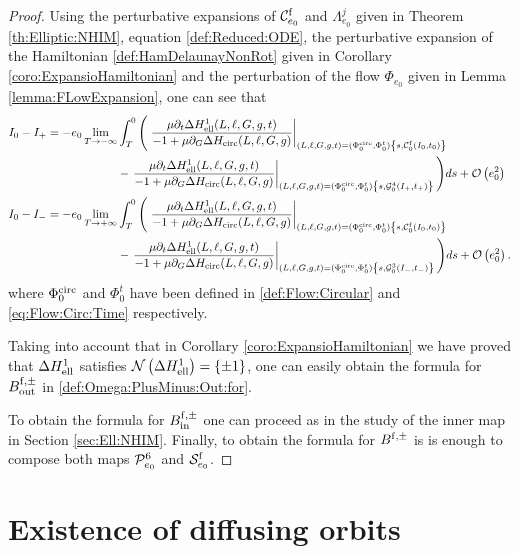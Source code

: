\begin{proof}
  Using the perturbative expansions of $\mathcal{C}^{\mathrm{f}}_{e_0}$ and $\Lambda^j_{e_0}$ given in Theorem \ref{th:Elliptic:NHIM}, equation \eqref{def:Reduced:ODE}, the perturbative expansion of the Hamiltonian \eqref{def:HamDelaunayNonRot} given in Corollary \ref{coro:ExpansioHamiltonian} and the perturbation of the flow $\Phi_{e_0}$ given in Lemma \ref{lemma:FLowExpansion}, one can see that
  \[
  \begin{split}
    I_0-I_+&=-e_0\lim_{T\rightarrow-\infty}\int_T^0\Bigg(\left.\frac{\mu\partial_t \Delta H^1_{\mathrm{ell}}(L,\ell,G,g,t)}{-1+\mu\partial_G\Delta H_{\mathrm{circ}}(L,\ell,G,g) }\right|_{(L,\ell,G,g,t)=(\Phi_0^{\mathrm{circ}},\Phi_0^t)\left\{s,\mathcal{C}^{\mathrm{f}}_{0}(I_0,t_0)\right\}}\\
    &\qquad\qquad\qquad-\left.\frac{\mu\partial_t \Delta H^1_{\mathrm{ell}}(L,\ell,G,g,t)}{-1+\mu\partial_G\Delta H_{\mathrm{circ}}(L,\ell,G,g) }\right|_{(L,\ell,G,g,t)=(\Phi_0^{\mathrm{circ}},\Phi_0^t)\left\{s,\mathcal{G}^4_{0}\left(I_+,t_+\right)\right\}}\Bigg)ds+\mathcal{O}\left(e_0^2\right)\\
 I_0-I_-&=-e_0\lim_{T\rightarrow+\infty}\int_T^0\Bigg(\left.\frac{\mu\partial_t \Delta H^1_{\mathrm{ell}}(L,\ell,G,g,t)}{-1+\mu\partial_G\Delta H_{\mathrm{circ}}(L,\ell,G,g) }\right|_{(L,\ell,G,g,t)=(\Phi_0^{\mathrm{circ}},\Phi_0^t)\left\{s,\mathcal{C}^{\mathrm{f}}_{0}(I_0,t_0)\right\}}\\
    &\qquad\qquad\qquad-\left.\frac{\mu\partial_t \Delta H^1_{\mathrm{ell}}(L,\ell,G,g,t)}{-1+\mu\partial_G\Delta H_{\mathrm{circ}}(L,\ell,G,g) }\right|_{(L,\ell,G,g,t)=(\Phi_0^{\mathrm{circ}},\Phi_0^t)\left\{s,\mathcal{G}^3_{0}\left(I_-,t_-\right)\right\}}\Bigg)ds+\mathcal{O}\left(e_0^2\right).
  \end{split}
  \]
  where $\Phi_0^{\mathrm{circ}}$ and $\Phi^t_0$ have been defined in \eqref{def:Flow:Circular} and \eqref{eq:Flow:Circ:Time} respectively.

  Taking into account that in Corollary \ref{coro:ExpansioHamiltonian} we have proved that $\Delta H_{\mathrm{ell}}^1$ satisfies $\mathcal{N}\left(\Delta H_{\mathrm{ell}}^1\right)=\{\pm 1\}$, one can easily obtain the formula for $B_{\mathrm{out}}^{\mathrm{f},\pm}$ in \eqref{def:Omega:PlusMinus:Out:for}.

To obtain the formula for $B_{\mathrm{in}}^{\mathrm{f},\pm}$ one can proceed as in the study of the inner map in Section \ref{sec:Ell:NHIM}. Finally, to obtain the formula for $B^{\mathrm{f},\pm}$ is is enough to compose both maps $\mathcal{P}_{e_0}^6$ and $\mathcal{S}_{e_0}^{\mathrm{f}}$.
\end{proof}


\section{Existence of diffusing orbits}\label{sec:ProofDiffusion}

